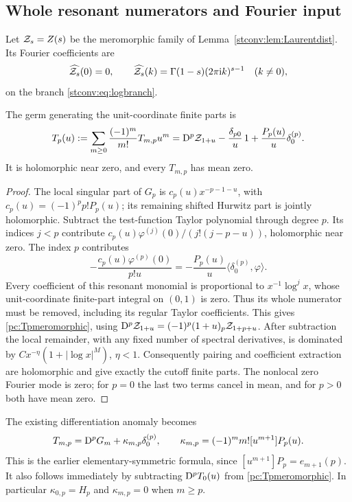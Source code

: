 \subsection{Whole resonant numerators and Fourier input}
Let $\mathcal Z_s=Z(s)$ be the meromorphic family of
Lemma~\ref{stconv:lem:Laurentdist}. Its Fourier coefficients are
\begin{equation}\label{pc:hurwitzFourier}
 \widehat{\mathcal Z_s}(0)=0,\qquad
 \widehat{\mathcal Z_s}(k)=\Gamma(1-s)(2\pi\mathrm{i} k)^{s-1}\quad(k\ne0),
\end{equation}
on the branch \eqref{stconv:eq:logbranch}.
\begin{lemma}\label{pc:resonant}
The germ generating the unit-coordinate finite parts is
\begin{equation}\label{pc:Tpmeromorphic}
 T_p(u):=\sum_{m\ge0}\frac{(-1)^m}{m!}T_{m,p}u^m
 =\mathrm D^p\mathcal Z_{1+u}-\frac{\delta_{p0}}u\,1
       +\frac{P_p(u)}u\delta_0^{(p)}.
\end{equation}
It is holomorphic near zero, and every $T_{m,p}$ has mean zero.
\end{lemma}
\begin{proof}
The local singular part of $G_p$ is
$c_p(u)x^{-p-1-u}$, with $c_p(u)=(-1)^pp!P_p(u)$; its remaining
shifted Hurwitz part is jointly holomorphic. Subtract the test-function
Taylor polynomial through degree $p$. Its indices $j<p$ contribute
$c_p(u)\varphi^{(j)}(0)/(j!(j-p-u))$, holomorphic near zero.
The index $p$ contributes
\[
 -\frac{c_p(u)\varphi^{(p)}(0)}{p!u}
   =-\frac{P_p(u)}u\langle\delta_0^{(p)},\varphi\rangle.
\]
Every coefficient of this resonant monomial is proportional to
$x^{-1}\log^j x$, whose unit-coordinate finite-part integral on $(0,1)$
is zero. Thus its whole numerator must be removed, including its regular
Taylor coefficients. This gives \eqref{pc:Tpmeromorphic}, using
$\mathrm D^p\mathcal Z_{1+u}=(-1)^p(1+u)_p\mathcal Z_{1+p+u}$.
After subtraction the local remainder, with any fixed number of spectral
derivatives, is dominated by $C x^{-\eta}(1+|\log x|^M)$, $\eta<1$.
Consequently pairing and coefficient extraction are holomorphic and give
exactly the cutoff finite parts. The nonlocal zero Fourier mode is zero;
for $p=0$ the last two terms cancel in mean, and for $p>0$ both have
mean zero.
\end{proof}

The existing differentiation anomaly becomes
\begin{equation}\label{pc:derivativeformula}
 T_{m,p}=\mathrm D^pG_m+\kappa_{m,p}\delta_0^{(p)},\qquad
 \kappa_{m,p}=(-1)^m m![u^{m+1}]P_p(u).
\end{equation}
This is the earlier elementary-symmetric formula, since
$[u^{m+1}]P_p=e_{m+1}(p)$. It also follows immediately by subtracting
$\mathrm D^pT_0(u)$ from \eqref{pc:Tpmeromorphic}. In particular
$\kappa_{0,p}=H_p$ and $\kappa_{m,p}=0$ when $m\ge p$.

